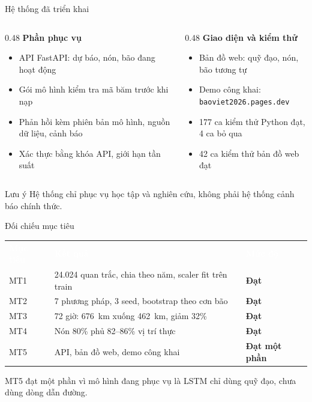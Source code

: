 \documentclass[aspectratio=169, 11pt, xcolor={table}]{beamer}
\newcommand{\dauBang}{\rowcolor{daunavy}}
\newcommand{\tb}[1]{\textcolor{white}{\textbf{#1}}}
\begin{document}
\begin{frame}{Hệ thống đã triển khai}
  \begin{columns}[T]
    \begin{column}{0.48\textwidth}
      \textbf{Phần phục vụ}
      \begin{itemize}
        \item API FastAPI: dự báo, nón, bão đang hoạt động
        \item Gói mô hình kiểm tra mã băm trước khi nạp
        \item Phản hồi kèm phiên bản mô hình, nguồn dữ liệu, cảnh báo
        \item Xác thực bằng khóa API, giới hạn tần suất
      \end{itemize}
    \end{column}
    \begin{column}{0.48\textwidth}
      \textbf{Giao diện và kiểm thử}
      \begin{itemize}
        \item Bản đồ web: quỹ đạo, nón, bão tương tự
        \item Demo công khai: \texttt{baoviet2026.pages.dev}
        \item \alert{177 ca kiểm thử Python đạt}, 4 ca bỏ qua
        \item 42 ca kiểm thử bản đồ web đạt
      \end{itemize}
    \end{column}
  \end{columns}
  \vspace{0.2em}
  \begin{block}{Lưu ý}
    Hệ thống chỉ phục vụ học tập và nghiên cứu, không phải hệ thống cảnh báo
    chính thức.
  \end{block}
\end{frame}

\begin{frame}{Đối chiếu mục tiêu}
  \centering
  \begin{tabular}{lll}
    \dauBang
    \tb{Mục tiêu} & \tb{Kết quả} & \tb{Mức độ} \\
    MT1 & 24.024 quan trắc, chia theo năm, scaler fit trên train & \textcolor{green!45!black}{\textbf{Đạt}} \\
    MT2 & 7 phương pháp, 3 seed, bootstrap theo cơn bão & \textcolor{green!45!black}{\textbf{Đạt}} \\
    MT3 & 72 giờ: 676~km xuống 462~km, giảm 32\% & \textcolor{green!45!black}{\textbf{Đạt}} \\
    MT4 & Nón 80\% phủ 82--86\% vị trí thực & \textcolor{green!45!black}{\textbf{Đạt}} \\
    MT5 & API, bản đồ web, demo công khai & \textcolor{daumaroon}{\textbf{Đạt một phần}} \\
    \bottomrule
  \end{tabular}

  \vspace{0.8em}
  \raggedright
  MT5 đạt một phần vì mô hình đang phục vụ là LSTM chỉ dùng quỹ đạo, chưa dùng
  dòng dẫn đường.
\end{frame}
\end{document}
